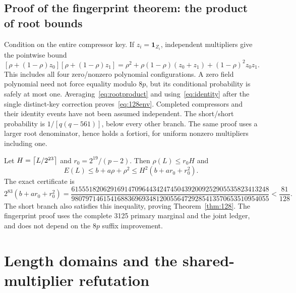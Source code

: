 \subsection{Proof of the fingerprint theorem: the product of root bounds}
Condition on the entire compressor key. If $z_i=\mathbf1_{Z_i}$, independent multipliers give the pointwise bound
\begin{equation}\label{eq:rootproduct}
 [\rho+(1-\rho)z_0][\rho+(1-\rho)z_1]
 =\rho^2+\rho(1-\rho)(z_0+z_1)+(1-\rho)^2z_0z_1.
\end{equation}
This includes all four zero/nonzero polynomial configurations. A zero field polynomial need not force equality modulo $8p$, but its conditional probability is safely at most one. Averaging~\eqref{eq:rootproduct} and using~\eqref{eq:identity} after the single distinct-key correction proves~\eqref{eq:128env}. Completed compressors and their identity events have not been assumed independent. The short/short probability is $1/[q(q-561)]$, below every other branch. The same proof uses a larger root denominator, hence holds a fortiori, for uniform nonzero multipliers including one.

Let $H=\left\lceil L/2^{23}\right\rceil$ and $r_0=2^{19}/(p-2)$. Then $\rho(L)\le r_0H$ and
\[
 E(L)\le b+a\rho+\rho^2\le H^2(b+ar_0+r_0^2).
\]
The exact certificate is
\[
 2^{83}(b+ar_0+r_0^2)
 =\frac{61555182062916914709644342474504392009252905535823413248}
 {98079714615416883696934812005564729285413570653510954055}
 <\frac{81}{128}.
\]
The short branch also satisfies this inequality, proving Theorem~\ref{thm:128}. The fingerprint proof uses the complete 3125 primary marginal and the joint ledger, and does not depend on the $8p$ suffix improvement.

\section{Length domains and the shared-multiplier refutation}\label{sec:domains}
